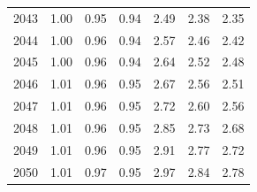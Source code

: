 \begin{table}
\begin{tabular}{lrrrrrr}
2043 & 1.00 & 0.95 & 0.94 & 2.49 & 2.38 & 2.35 \\
2044 & 1.00 & 0.96 & 0.94 & 2.57 & 2.46 & 2.42 \\
2045 & 1.00 & 0.96 & 0.94 & 2.64 & 2.52 & 2.48 \\
2046 & 1.01 & 0.96 & 0.95 & 2.67 & 2.56 & 2.51 \\
2047 & 1.01 & 0.96 & 0.95 & 2.72 & 2.60 & 2.56 \\
2048 & 1.01 & 0.96 & 0.95 & 2.85 & 2.73 & 2.68 \\
2049 & 1.01 & 0.96 & 0.95 & 2.91 & 2.77 & 2.72 \\
2050 & 1.01 & 0.97 & 0.95 & 2.97 & 2.84 & 2.78 \\
\bottomrule
\end{tabular}
\end{table}
